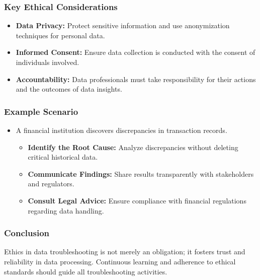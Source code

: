 \documentclass{beamer}
\begin{document}
\begin{frame}[fragile]
    \frametitle{Key Ethical Considerations}
    \begin{itemize}
        \item \textbf{Data Privacy:} Protect sensitive information and use anonymization techniques for personal data.
        \item \textbf{Informed Consent:} Ensure data collection is conducted with the consent of individuals involved.
        \item \textbf{Accountability:} Data professionals must take responsibility for their actions and the outcomes of data insights.
    \end{itemize}
\end{frame}

\begin{frame}[fragile]
    \frametitle{Example Scenario}
    \begin{itemize}
        \item A financial institution discovers discrepancies in transaction records.
        \begin{itemize}
            \item \textbf{Identify the Root Cause:} Analyze discrepancies without deleting critical historical data.
            \item \textbf{Communicate Findings:} Share results transparently with stakeholders and regulators.
            \item \textbf{Consult Legal Advice:} Ensure compliance with financial regulations regarding data handling.
        \end{itemize}
    \end{itemize}
\end{frame}

\begin{frame}[fragile]
    \frametitle{Conclusion}
    Ethics in data troubleshooting is not merely an obligation; it fosters trust and reliability in data processing. Continuous learning and adherence to ethical standards should guide all troubleshooting activities.
\end{frame}
\end{document}
